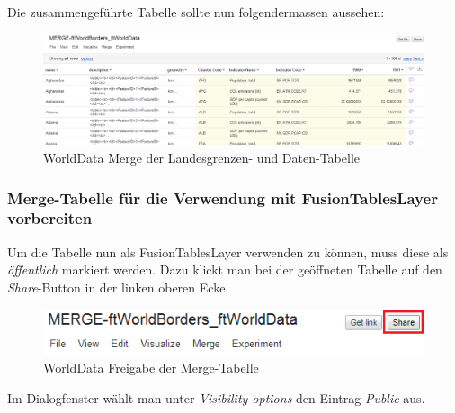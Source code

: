 Die zusammengeführte Tabelle sollte nun folgendermassen aussehen:

\begin{figure}[!h]
	\centering
	\includegraphics[scale=0.4]{images/usecase1-worlddata/documentation/worlddata-merge_done.png}
	\caption{WorldData Merge der Landesgrenzen- und Daten-Tabelle}
	\label{worlddata-merge_done}
\end{figure}

\subsubsection{Merge-Tabelle für die Verwendung mit FusionTablesLayer vorbereiten}
Um die Tabelle nun als FusionTablesLayer verwenden zu können, muss diese als \emph{öffentlich} markiert werden. Dazu klickt man bei der geöffneten Tabelle auf den \emph{Share}-Button in der linken oberen Ecke.

\begin{figure}[!h]
	\centering
	\includegraphics{images/usecase1-worlddata/documentation/worlddata-prepare_fusiontableslayer1.png}
	\caption{WorldData Freigabe der Merge-Tabelle}
	\label{worlddata-prepare_fusiontableslayer1}
\end{figure}

Im Dialogfenster wählt man unter \emph{Visibility options} den Eintrag \emph{Public} aus.

